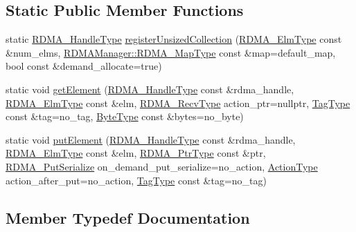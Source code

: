 \subsection*{Static Public Member Functions}
\begin{DoxyCompactItemize}
\item 
static \hyperlink{namespacevt_a10442579ec4e7ebef223818e64bcf908}{R\+D\+M\+A\+\_\+\+Handle\+Type} \hyperlink{structvt_1_1rdma_1_1_r_d_m_a_collection_manager_aada28534174a18a0cfc96de0b7d0d823}{register\+Unsized\+Collection} (\hyperlink{namespacevt_a2c2a902092b72056f70210c159f966f0}{R\+D\+M\+A\+\_\+\+Elm\+Type} const \&num\+\_\+elms, \hyperlink{structvt_1_1rdma_1_1_r_d_m_a_manager_a16e12d11cf7d771df0d3dc6947a4f95c}{R\+D\+M\+A\+Manager\+::\+R\+D\+M\+A\+\_\+\+Map\+Type} const \&map=default\+\_\+map, bool const \&demand\+\_\+allocate=true)
\item 
static void \hyperlink{structvt_1_1rdma_1_1_r_d_m_a_collection_manager_a3c189a72c3359cf3614c2477e9c1d919}{get\+Element} (\hyperlink{namespacevt_a10442579ec4e7ebef223818e64bcf908}{R\+D\+M\+A\+\_\+\+Handle\+Type} const \&rdma\+\_\+handle, \hyperlink{namespacevt_a2c2a902092b72056f70210c159f966f0}{R\+D\+M\+A\+\_\+\+Elm\+Type} const \&elm, \hyperlink{namespacevt_1_1rdma_a36020f2b7ae371b6ddc8ec9caffb72d2}{R\+D\+M\+A\+\_\+\+Recv\+Type} action\+\_\+ptr=nullptr, \hyperlink{namespacevt_a84ab281dae04a52a4b243d6bf62d0e52}{Tag\+Type} const \&tag=no\+\_\+tag, \hyperlink{namespacevt_aab8d55968084610ce3b17057981e9300}{Byte\+Type} const \&bytes=no\+\_\+byte)
\item 
static void \hyperlink{structvt_1_1rdma_1_1_r_d_m_a_collection_manager_a0c39db9a1b61df2815a5bdcb9ab49bfa}{put\+Element} (\hyperlink{namespacevt_a10442579ec4e7ebef223818e64bcf908}{R\+D\+M\+A\+\_\+\+Handle\+Type} const \&rdma\+\_\+handle, \hyperlink{namespacevt_a2c2a902092b72056f70210c159f966f0}{R\+D\+M\+A\+\_\+\+Elm\+Type} const \&elm, \hyperlink{namespacevt_aab05b4a584f7ee835a6d0f66915cf59b}{R\+D\+M\+A\+\_\+\+Ptr\+Type} const \&ptr, \hyperlink{namespacevt_abeb0129c92a5721f6f2c01b621f149fe}{R\+D\+M\+A\+\_\+\+Put\+Serialize} on\+\_\+demand\+\_\+put\+\_\+serialize=no\+\_\+action, \hyperlink{namespacevt_ae0a5a7b18cc99d7b732cb4d44f46b0f3}{Action\+Type} action\+\_\+after\+\_\+put=no\+\_\+action, \hyperlink{namespacevt_a84ab281dae04a52a4b243d6bf62d0e52}{Tag\+Type} const \&tag=no\+\_\+tag)
\end{DoxyCompactItemize}


\subsection{Member Typedef Documentation}
\mbox{\label{structvt_1_1rdma_1_1_r_d_m_a_collection_manager_a4618a654161e92d2fcc2ab099eba9b65}} 
